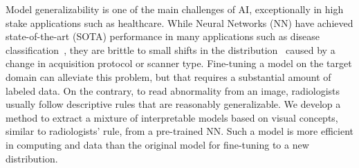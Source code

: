 







Model generalizability is one of the main challenges of AI, exceptionally in high stake applications such as healthcare. While Neural Networks (NN) have achieved state-of-the-art (SOTA) performance in many applications such as disease classification~\cite{irvin2019chexpert}, they are brittle to small shifts in the distribution~\cite{guan2021domain} caused by a change in acquisition protocol or scanner type. Fine-tuning a model on the target domain can alleviate this problem, but that requires a substantial amount of labeled data. On the contrary, to read abnormality from an image, radiologists usually follow descriptive rules that are reasonably generalizable. We develop a method to extract a mixture of interpretable models based on visual concepts, similar to radiologists' rule, from a pre-trained NN. Such a model is more efficient in computing and data than the original model for fine-tuning to a new distribution.





